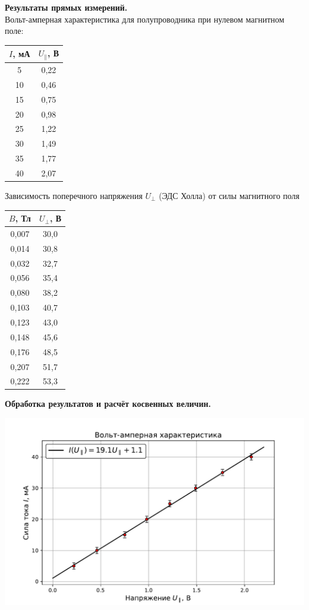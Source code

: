 \documentclass[a4paper]{article}
\begin{document}
	{\parindent=0pt\textbf{Результаты прямых измерений.}}\\
	Вольт-амперная характеристика для полупроводника при нулевом магнитном поле:
	\begin{center}
	\begin{tabular}{c|c}
		\hline
		$I$, мА&$U_{\parallel}$, В  \\
		\hline
		5&0,22  \\
		10&  0,46\\
		15&  0,75\\
		20&  0,98\\
		25&  1,22\\
		30&  1,49\\
		35&  1,77\\
		40&  2,07\\
		
	\end{tabular}
\end{center}
Зависимость поперечного напряжения $U_{\perp}$ (ЭДС Холла) от силы магнитного поля
\begin{center}
	\begin{tabular}{c|c}
		\hline
		$B$, Тл  & $U_{\perp}$, В \\
		\hline
		 0,007 &  30,0\\
		  	0,014		&  30,8\\
		  	0,032		&  32,7\\
		 		0,056	& 35,4 \\
		 			0,080 & 38,2 \\
		  			0,103	&  40,7\\
		  			0,123	& 43,0 \\
		  		0,148	& 45,6 \\
		 			0,176& 48,5 \\
					 0,207&  51,7\\
		 				 0,222& 53,3 \\
	\end{tabular}
\end{center}

{\parindent=0pt\textbf{Обработка результатов и расчёт косвенных величин.}}\\
\begin{center}
	\includegraphics[scale=0.7]{BAX}
\end{center}
\end{document}
